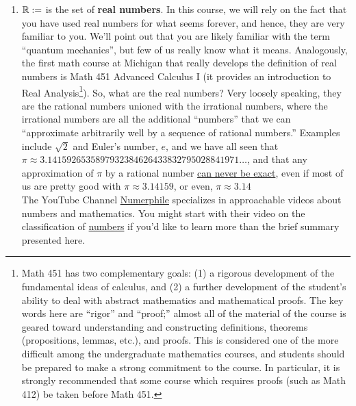 \begin{tcolorbox}[colback = mylightblue, title=\textbf{Given the above as motivation, we define a set of symbols that we will frequently use in the course:}, breakable]
\begin{definition}
\begin{enumerate}
        \item  $\mathbb R:=$ is the set of \textbf{real numbers}. In this course, we will rely on the fact that you have used real numbers for what seems forever, and hence, they are very familiar to you. We'll point out that you are likely familiar with the term ``quantum mechanics'', but few of us really know what it means. Analogously, the first math course at Michigan that really develops the definition of real numbers is Math 451 Advanced Calculus I (it provides an introduction to Real Analysis\footnote{Math 451 has two complementary goals:  (1) a rigorous development of the fundamental ideas of calculus, and  (2) a further development of the student’s ability to deal with abstract mathematics and mathematical proofs. The key words here are ``rigor'' and ``proof;'' almost all of the material of the course is geared toward understanding and constructing definitions, theorems (propositions, lemmas, etc.), and proofs. This is considered one of the more difficult among the undergraduate mathematics courses, and students should be prepared to make a strong commitment to the course.  In particular, it is strongly recommended that some course which requires proofs (such as Math 412) be taken before Math 451.}). So, what are the real numbers? Very loosely speaking, they are the rational numbers unioned with the irrational numbers, where the irrational numbers are all the additional ``numbers'' that we can ``approximate arbitrarily well by a sequence of rational numbers.'' Examples include $\sqrt{2}$ and Euler's number, $e$, and we have all seen that $\pi \approx 3.14159 26535 89793 23846 26433 83279 50288 41971\ldots$, and that any approximation of $\pi$ by a rational number \href{https://abcnews.go.com/US/happy-\pi-day-indiana-define-\pi-32-bill/story?id=61644614}{can never be exact}, even if most of us are pretty good with $\pi \approx 3.14159$, or even, $\pi \approx 3.14$ \\
        
        The YouTube Channel \href{https://www.youtube.com/@numberphile}{Numerphile} specializes in approachable videos about numbers and mathematics. You might start with their video on the classification of \href{https://youtu.be/5TkIe60y2GI}{numbers} if you'd like to learn more than the brief summary presented here.
        


\end{enumerate}
\end{definition}
\end{tcolorbox}

